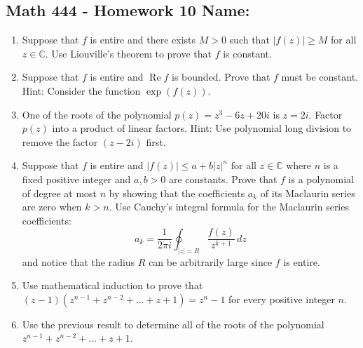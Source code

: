 \documentclass[11pt]{article}
\newcommand{\C}{\mathbb{C}}
\newcommand{\re}{\operatorname{Re}}
\begin{document}
\pagestyle{empty}
\subsection*{Math 444 - Homework 10 \hfill Name: \underline{\hspace*{2in}}}
\noindent

\begin{enumerate}
\item Suppose that $f$ is entire and there exists $M > 0$ such that $|f(z)| \ge M$ for all $z \in \C$.  Use Liouville's theorem to prove that $f$ is constant.  
\vfill

\item Suppose that $f$ is entire and $\re f$ is bounded. Prove that $f$ must be constant.  Hint: Consider the function $\exp(f(z))$.  
\vfill


\item One of the roots of the polynomial $p(z) = z^3 - 6z + 20i$ is $z = 2i$.  Factor $p(z)$ into a product of linear factors. Hint: Use polynomial long division to remove the factor $(z-2i)$ first.
\vfill

\newpage


\item Suppose that $f$ is entire and $|f(z)| \le a+b|z|^n$ for all $z \in \C$ where $n$ is a fixed positive integer and $a,b > 0$ are constants.  Prove that $f$ is a polynomial of degree at most $n$ by showing that the coefficients $a_k$ of its Maclaurin series are zero when $k > n$.  Use Cauchy's integral formula for the Maclaurin series coefficients:
$$a_k = \frac{1}{2\pi i} \oint_{|z|=R} \frac{f(z)}{z^{k+1}} \, dz$$
and notice that the radius $R$ can be arbitrarily large since $f$ is entire.
\vfill

\item Use mathematical induction to prove that $(z-1)(z^{n-1} + z^{n-2} + \ldots + z + 1) = z^n - 1$ for every positive integer $n$.
\vfill

\item Use the previous result to determine all of the roots of the polynomial $z^{n-1} + z^{n-2} + \ldots + z + 1$.  
\vfill


\end{enumerate}
\end{document}
